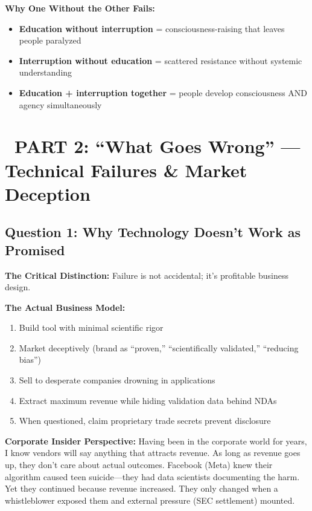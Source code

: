 \documentclass[12pt,letterpaper]{article}
\begin{document}
\textbf{Why One Without the Other Fails:}

\begin{itemize}[leftmargin=*,noitemsep]
    \item \textbf{Education without interruption} = consciousness-raising that leaves people paralyzed
    \item \textbf{Interruption without education} = scattered resistance without systemic understanding
    \item \textbf{Education + interruption together} = people develop consciousness AND agency simultaneously
\end{itemize}

\newpage
\section*{\color{primaryblue}\faFlag\ PART 2: ``What Goes Wrong'' — Technical Failures \& Market Deception}

\subsection*{Question 1: Why Technology Doesn't Work as Promised}

\begin{criticalinsight}
\textbf{The Critical Distinction:} Failure is not accidental; it's profitable business design.
\end{criticalinsight}

\textbf{The Actual Business Model:}
\begin{enumerate}[leftmargin=*,noitemsep]
    \item Build tool with minimal scientific rigor
    \item Market deceptively (brand as ``proven,'' ``scientifically validated,'' ``reducing bias'')
    \item Sell to desperate companies drowning in applications
    \item Extract maximum revenue while hiding validation data behind NDAs
    \item When questioned, claim proprietary trade secrets prevent disclosure
\end{enumerate}

\begin{personalreflection}
\textbf{Corporate Insider Perspective:} Having been in the corporate world for years, I know vendors will say anything that attracts revenue. As long as revenue goes up, they don't care about actual outcomes. Facebook (Meta) knew their algorithm caused teen suicide—they had data scientists documenting the harm. Yet they continued because revenue increased. They only changed when a whistleblower exposed them and external pressure (SEC settlement) mounted.
\end{personalreflection}
\end{document}
